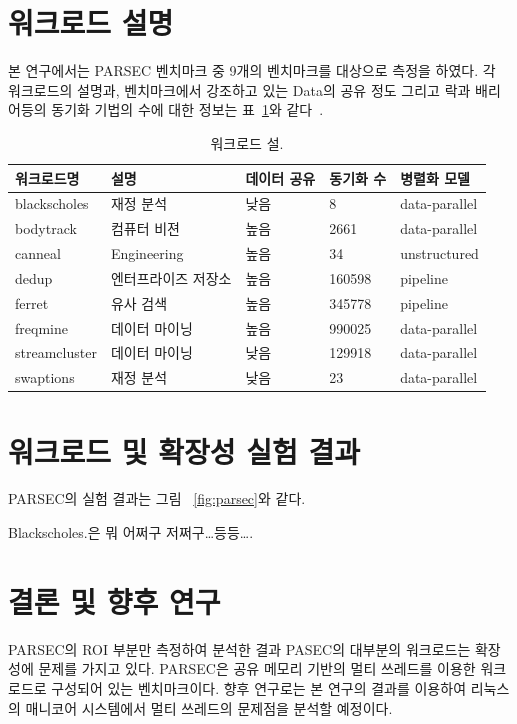 \documentclass{kcc}
\begin{document}
\section{워크로드 설명}
본 연구에서는 PARSEC 벤치마크 중 9개의 벤치마크를 대상으로 측정을 하였다. 
각 워크로드의 설명과, 벤치마크에서 강조하고 있는 Data의 공유 정도 그리고
 락과 배리어등의 동기화 기법의 수에 대한 정보는  표~\ref{tab:workload}와 같다~\cite{parsecbench}.

\begin{table}[h!]
  \caption{워크로드 설.}
  \centering
  \scriptsize 
  \begin{tabular}{l l l l l} \toprule 
    워크로드명 & 설명 & 데이터 공유 & 동기화 수 & 병렬화 모델\\
    \midrule
    blackscholes & 재정 분석 & 낮음 & 8 & data-parallel\\
    \midrule
    bodytrack & 컴퓨터 비젼 & 높음 & 2661 & data-parallel\\
    \midrule
    canneal & Engineering & 높음 & 34 & unstructured\\
    \midrule
    dedup & 엔터프라이즈 저장소 & 높음 & 160598 & pipeline\\
    \midrule
    ferret & 유사 검색 & 높음 & 345778 & pipeline\\
    \midrule
    freqmine & 데이터 마이닝 & 높음 & 990025 & data-parallel\\
    \midrule
    streamcluster & 데이터 마이닝 & 낮음 & 129918 & data-parallel\\
    \midrule
    swaptions & 재정 분석 & 낮음 & 23 & data-parallel \\
    \bottomrule
  \end{tabular}
  \label{tab:workload}
\end{table}

\section{워크로드 및 확장성 실험 결과}

PARSEC의 실험 결과는 그림 ~\ref{fig:parsec}와 같다. 

Blackscholes.은 뭐 어쩌구 저쩌구\ldots 등등\ldots.

\section{결론 및 향후 연구}

PARSEC의 ROI 부분만 측정하여 분석한 결과 PASEC의 대부분의 워크로드는 확장성에 문제를 
가지고 있다. PARSEC은 공유 메모리 기반의 멀티 쓰레드를 이용한 워크로드로 구성되어 
있는 벤치마크이다.
향후 연구로는 본 연구의 결과를 이용하여 리눅스의 매니코어 시스템에서 멀티 쓰레드의 
문제점을 분석할 예정이다.
\end{document}
